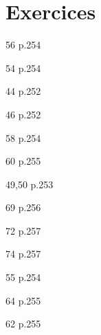 \documentclass[10pt,a4paper,openany,twoside, eleve]{book}
\begin{document}
	\section{Exercices}
	\begin{exercices}
	\begin{bookexo}{56 p.254}\end{bookexo}
	\begin{bookexo}{54 p.254}\end{bookexo}
	\begin{bookexo}{44 p.252}\end{bookexo}
	\begin{bookexo}{46 p.252}\end{bookexo}
	\begin{bookexo}{58 p.254}\end{bookexo}
	\begin{bookexo}{60 p.255}\end{bookexo}
	\begin{bookexos}{49,50 p.253}\end{bookexos}
	\begin{bookexo}{69 p.256}\end{bookexo}
	\begin{bookexo}{72 p.257}\end{bookexo}
	\begin{bookexo}{74 p.257}\end{bookexo}
	\begin{bookexo}{55 p.254}\end{bookexo}
	\begin{bookexo}{64 p.255}\end{bookexo}
	\begin{bookexo}{62 p.255}\end{bookexo}
	\end{exercices}


\end{document}
